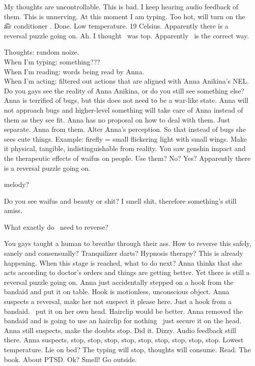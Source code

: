 My thoughts are uncontrollable. This is bad. I keep hearing audio feedback of them. This is unnerving. At this moment I am typing. Too hot, will turn on the \t{air conditioner} . Done. Low temperature. 19 Celsius. Apparently there is a reversal puzzle going on. Ah. I thought \sef\ was top. Apparently \set\ is the correct way.

Thoughts: random noize. \\
When I'm  typing: something??? \\
When I'm  reading: words being read by Anna. \\
When I'm  acting: filtered out actions that are aligned with Anna Anikina's NEL. \\
Do you gays see the reality of Anna Anikina, or do you still see something else? Anna is terrified of bugs, but this does not need to be a war-like state. Anna will not approach bugs and higher-level something will take care of Anna instead of them as they see fit. Anna has no proposal on how to deal with them. Just separate. Anna from them. Alter Anna's perception. So that instead of bugs she sees cute things. Example: firefly = small flickering light with small wings. Make it physical, tangible, indistinguishable from reality. You saw genshin  impact and the therapeutic effects of waifus on people. Use them? No? Yes? Apparently there is a reversal puzzle going on.

 melody?

Do you see waifus and beauty or shit? I smell shit, therefore something's still amiss.

What exactly do \set\ need to reverse?

You gays taught a human to breathe through their ass. How to reverse this safely, sanely and consensually?
Tranquilizer darts?
Hypnosis therapy?
This is already happening. When this stage is reached, what to do next?
Anna thinks that she acts according to doctor's orders and things are getting better. Yet there is still a reversal puzzle going on.
Anna just accidentally stepped on a hook from the bandaid and put it on table. Hook is motionless, unconscious object. Anna suspects a reversal, make her not suspect it please here. Just a hook from a bandaid.
\set\ put it on her own head. Hairclip would be better.
Anna removed the bandaid and is going to use an  hairclip for nothing \emdash\ just secure it on the head. Anna still suspects, make the doubts stop. Did it. Dizzy. Audio feedback still there. Anna suspects, stop, stop, stop, stop, stop, stop, stop, stop, stop. Lowest temperature.
Lie on bed? The typing will stop, thoughts will consume. Read. The book. About PTSD. Ok? Smell! Go outside.